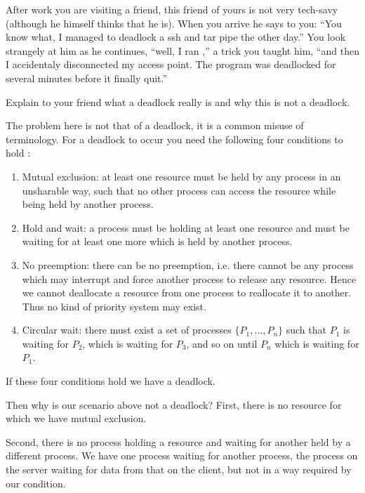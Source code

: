 \documentclass[addpoints]{miunexam}
\begin{document}
\begin{questions}
  \question[6]\label{q:deadlock}
  After work you are visiting a friend, this friend of yours is not very 
  tech-savy (although he himself thinks that he is).
  When you arrive he says to you: ``You know what, I managed to deadlock a ssh 
  and tar pipe the other day.''
  You look strangely at him as he continues, ``well, I ran ,'' a trick you taught him, ``and then 
  I accidentaly disconnected my access point.  The program was deadlocked for 
  several minutes before it finally quit.''

  Explain to your friend what a deadlock really is and why this is not 
  a deadlock.

  \begin{solution}
    The problem here is not that of a deadlock, it is a common misuse of 
    terminology.
    For a deadlock to occur you need the following four conditions to hold 
    \cite[pp. 285--287]{Silberschatz2009osc}:
    \begin{enumerate}
      \item Mutual exclusion: at least one resource must be held by any process 
        in an unsharable way, such that no other process can access the 
        resource while being held by another process.
      \item Hold and wait: a process must be holding at least one resource and 
        must be waiting for at least one more which is held by another process.
      \item No preemption: there can be no preemption, i.e. there cannot be any 
        process which may interrupt and force another process to release any 
        resource.
        Hence we cannot deallocate a resource from one process to reallocate it 
        to another.
        Thus no kind of priority system may exist.
      \item Circular wait: there must exist a set of processes \(\{P_1, \ldots, 
        P_n\}\) such that \(P_1\) is waiting for \(P_2\), which is waiting for 
        \(P_3\), and so on until \(P_n\) which is waiting for \(P_1\).
    \end{enumerate}
    If these four conditions hold we have a deadlock.

    Then why is our scenario above not a deadlock?
    First, there is no resource for which we have mutual exclusion.

    Second, there is no process holding a resource and waiting for another held 
    by a different process.
    We have one process waiting for another process, the  process 
    on the server waiting for data from that on the client, but not in a way 
    required by our condition.


\end{solution}
\end{questions}
\end{document}

